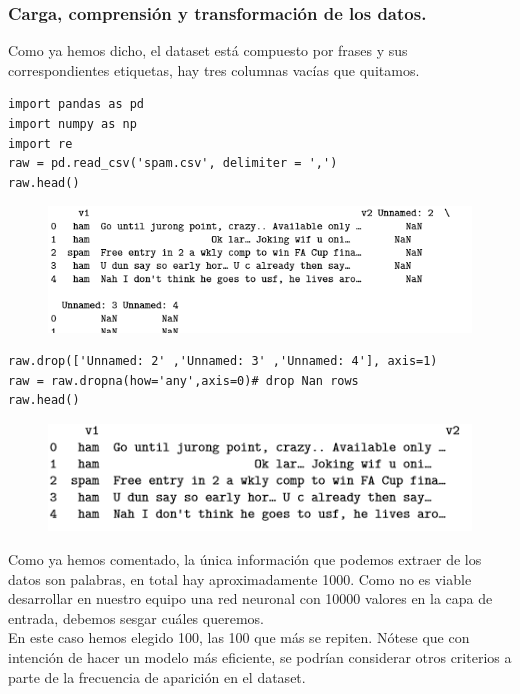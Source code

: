 \documentclass[a4paper,11pt]{article}
\begin{document}
\subsubsection{Carga, comprensión y transformación de los datos.}
Como ya hemos dicho, el dataset está compuesto por frases y sus correspondientes etiquetas, hay tres columnas vacías que quitamos.
\begin{lstlisting}
import pandas as pd
import numpy as np
import re
raw = pd.read_csv('spam.csv', delimiter = ',')
raw.head()
\end{lstlisting}
\begin{figure}[H]
\centering
\includegraphics[scale=0.9]{Annotation 2020-03-23 174228.png}
\end{figure}
\begin{lstlisting}
raw.drop(['Unnamed: 2' ,'Unnamed: 3' ,'Unnamed: 4'], axis=1)
raw = raw.dropna(how='any',axis=0)# drop Nan rows
raw.head()
\end{lstlisting}
\begin{figure}[H]
\centering
\includegraphics{Annotation 2020-03-23 174341.png}
\end{figure}
Como ya hemos comentado, la única información que podemos extraer de los datos son palabras, en total hay aproximadamente 1000. Como no es viable desarrollar en nuestro equipo una red neuronal con 10000 valores en la capa de entrada, debemos sesgar cuáles queremos.\\ 

\noindent
En este caso hemos elegido 100, las 100 que más se repiten. Nótese que con intención de hacer un modelo más eficiente, se podrían considerar otros criterios a parte de la frecuencia de aparición en el dataset.\\
\end{document}
